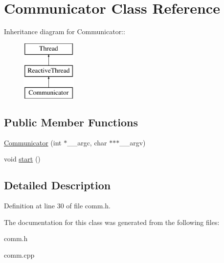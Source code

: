\hypertarget{classCommunicator}{
\section{Communicator Class Reference}
\label{classCommunicator}
}
Inheritance diagram for Communicator::\begin{figure}[H]
\begin{center}
\leavevmode
\includegraphics[height=3cm]{classCommunicator}
\end{center}
\end{figure}
\subsection*{Public Member Functions}
\begin{CompactItemize}
\item 
\hypertarget{classCommunicator_7c9dce4ea92bd04d01d53f80c0ef08ee}{
\hyperlink{classCommunicator_7c9dce4ea92bd04d01d53f80c0ef08ee}{Communicator} (int $\ast$\_\-\_\-argc, char $\ast$$\ast$$\ast$\_\-\_\-argv)}
\label{classCommunicator_7c9dce4ea92bd04d01d53f80c0ef08ee}

\item 
\hypertarget{classCommunicator_142fae13b16b166519315f248a513c62}{
void \hyperlink{classCommunicator_142fae13b16b166519315f248a513c62}{start} ()}
\label{classCommunicator_142fae13b16b166519315f248a513c62}

\end{CompactItemize}


\subsection{Detailed Description}




Definition at line 30 of file comm.h.

The documentation for this class was generated from the following files:\begin{CompactItemize}
\item 
comm.h\item 
comm.cpp\end{CompactItemize}
